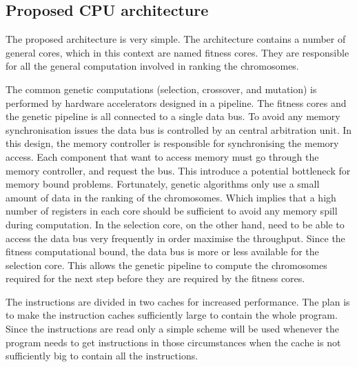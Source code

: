 \subsection {Proposed CPU architecture}

The proposed architecture is very simple. The architecture contains a number of general cores, which in this context are named fitness cores. They are responsible for all the general computation involved in ranking the chromosomes.

The common genetic computations (selection, crossover, and mutation) is performed by hardware accelerators designed in a pipeline. The fitness cores and the genetic pipeline is all connected to a single data bus. To avoid any memory synchronisation issues the data bus is controlled by an central arbitration unit. In this design, the memory controller is responsible for synchronising the memory access. Each component that want to access memory must go through the memory controller, and request the bus. This introduce a potential bottleneck for memory bound problems. Fortunately, genetic algorithms only use a small amount of data in the ranking of the chromosomes. Which implies that a high number of registers in each core should be sufficient to avoid any memory spill during computation. In the selection core, on the other hand, need to be able to access the data bus very frequently in order maximise the throughput. Since the fitness computational bound, the data bus is more or less available for the selection core. This allows the genetic pipeline to compute the chromosomes required for the next step before they are required by the fitness cores. 


The instructions are divided in two caches for increased performance. The plan is to make the instruction caches sufficiently large to contain the whole program. Since the instructions are read only a simple scheme will be used whenever the program needs to get instructions in those circumstances when the cache is not sufficiently big to contain all the instructions. 



